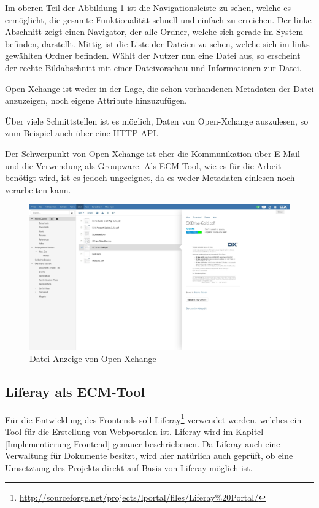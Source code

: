 Im oberen Teil der Abbildung \ref{Xchange Dateianzeige} ist die Navigationsleiste zu sehen, welche es erm\"oglicht, die gesamte Funktionalit\"at schnell und einfach zu erreichen. Der linke Abschnitt zeigt einen Navigator, der alle Ordner, welche sich gerade im System befinden, darstellt. Mittig ist die Liste der Dateien zu sehen, welche sich im links gew\"ahlten Ordner befinden. W\"ahlt der Nutzer nun eine Datei aus, so erscheint der rechte Bildabschnitt mit einer Dateivorschau und Informationen zur Datei.

Open-Xchange ist weder in der Lage, die schon vorhandenen Metadaten der Datei anzuzeigen, noch eigene Attribute hinzuzuf\"ugen.

\"Uber viele Schnittstellen ist es m\"oglich, Daten von Open-Xchange auszulesen, so zum Beispiel auch \"uber eine HTTP-\ac{API}. \cite{Oxpedia_HTTP_API}

Der Schwerpunkt von Open-Xchange ist eher die Kommunikation \"uber E-Mail und die Verwendung als Groupware. Als \ac{ECM}-Tool, wie es f\"ur die Arbeit ben\"otigt wird, ist es jedoch ungeeignet, da es weder Metadaten einlesen noch verarbeiten kann.

\begin{figure}[!ht]
\centering
\includegraphics[width=16cm]{Bilder/xchange_Oberflaeche.jpg}
\caption{Datei-Anzeige von Open-Xchange}
\label{Xchange Dateianzeige}
\centering
\end{figure}

\FloatBarrier
\subsection{Liferay als ECM-Tool} \label{Liferay}
F\"ur die Entwicklung des Frontends soll Liferay\footnote{\url{http://sourceforge.net/projects/lportal/files/Liferay\%20Portal/}} verwendet werden, welches ein Tool f\"ur die Erstellung von Webportalen ist.
Liferay wird im Kapitel \ref{Implementierung Frontend} genauer beschriebenen.
Da Liferay auch eine Verwaltung f\"ur Dokumente besitzt, wird hier nat\"urlich auch gepr\"uft, ob eine Umsetztung des Projekts direkt auf Basis von Liferay m\"oglich ist.

